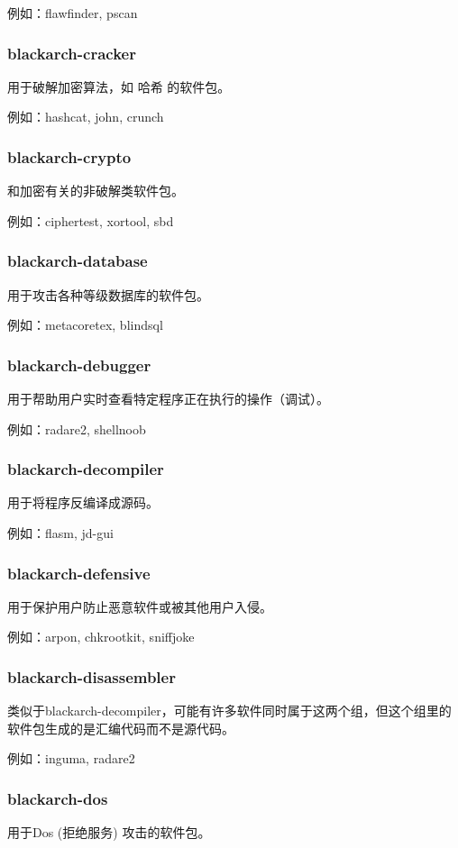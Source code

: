 \documentclass[a4paper, oneside, 11pt]{book}
\begin{document}
例如：flawfinder, pscan

\subsubsection{blackarch-cracker}
用于破解加密算法，如 哈希 的软件包。

例如：hashcat, john, crunch

\subsubsection{blackarch-crypto}
和加密有关的非破解类软件包。

例如：ciphertest, xortool, sbd

\subsubsection{blackarch-database}
用于攻击各种等级数据库的软件包。

例如：metacoretex, blindsql

\subsubsection{blackarch-debugger}
用于帮助用户实时查看特定程序正在执行的操作（调试）。

例如：radare2, shellnoob

\subsubsection{blackarch-decompiler}
用于将程序反编译成源码。

例如：flasm, jd-gui

\subsubsection{blackarch-defensive}
用于保护用户防止恶意软件或被其他用户入侵。

例如：arpon, chkrootkit, sniffjoke

\subsubsection{blackarch-disassembler}
类似于blackarch-decompiler，可能有许多软件同时属于这两个组，但这个组里的软件包生成的是汇编代码而不是源代码。

例如：inguma, radare2

\subsubsection{blackarch-dos}
用于Dos (拒绝服务) 攻击的软件包。
\end{document}
